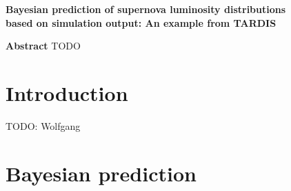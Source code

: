 \documentclass[11pt]{article}
\begin{document}
\begin{center}
  \textbf{\Large Bayesian prediction of supernova luminosity  distributions}\\[8pt]
  \textbf{\Large based on simulation output: An example from TARDIS}\\[12pt]
\end{center}

\textbf{Abstract} TODO

\section{Introduction}

TODO: Wolfgang

\section{Bayesian prediction}
\end{document}
